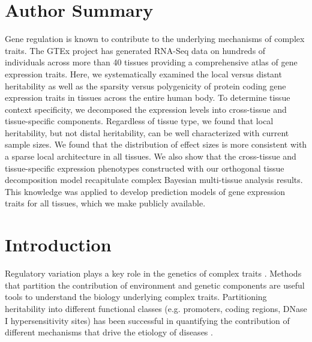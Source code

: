 \documentclass[10pt,letterpaper]{article}
\begin{document}
\section*{Author Summary} %
Gene regulation is known to contribute to the underlying mechanisms of complex traits. The GTEx project has generated RNA-Seq data on hundreds of individuals across more than 40 tissues providing a comprehensive atlas of gene expression traits. Here, we systematically examined the local versus distant heritability as well as the sparsity versus polygenicity of protein coding gene expression traits in tissues across the entire human body. To determine tissue context specificity, we decomposed the expression levels into cross-tissue and tissue-specific components. Regardless of tissue type, we found that local heritability, but not distal heritability, can be well characterized with current sample sizes. We found that the distribution of effect sizes is more consistent with a sparse local architecture in all tissues. We also show that the cross-tissue and tissue-specific expression phenotypes constructed with our orthogonal tissue decomposition model recapitulate complex Bayesian multi-tissue analysis results. This knowledge was applied to develop prediction models of gene expression traits for all tissues, which we make publicly available.

\linenumbers


\section*{Introduction}
Regulatory variation plays a key role in the genetics of complex traits \cite{Nicolae_2010, Nica_2010, Gusev_2014}. Methods that partition the contribution of environment and genetic components are useful tools to understand the biology underlying complex traits. Partitioning heritability into different functional classes (e.g. promoters, coding regions, DNase I hypersensitivity sites) has been successful in quantifying the contribution of different mechanisms that drive the etiology of diseases \cite{Gusev_2014,torres2014cross,davis2013partitioning}.
\end{document}
